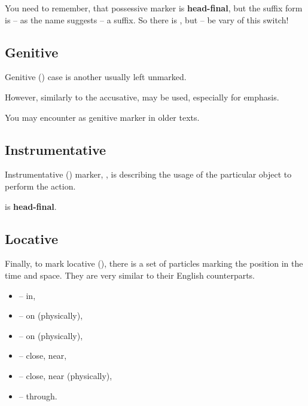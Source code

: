 You need to remember, that possessive marker is \textbf{head-final}, but the
suffix form is -- as the name suggests -- a suffix. So there is , but  -- be vary of this switch!

\subsection{Genitive}

Genitive (\Gen{}) case is another usually left unmarked.


However, similarly to the accusative,  may be used, especially for
emphasis.


You may encounter  as genitive marker in older texts.

\subsection{Instrumentative}

Instrumentative (\Ins{}) marker, , is describing the usage of the
particular object to perform the action.


 is \textbf{head-final}.

\subsection{Locative}

Finally, to mark locative (\Loc{}), there is a set of particles marking the
position in the time and space. They are very similar to their English
counterparts.

\begin{itemize}
    \item {} -- in,
    \item {} -- on (physically),
    \item {} -- on (physically),
    \item {} -- close, near,
    \item {} -- close, near (physically),
    \item {} -- through.
\end{itemize}

